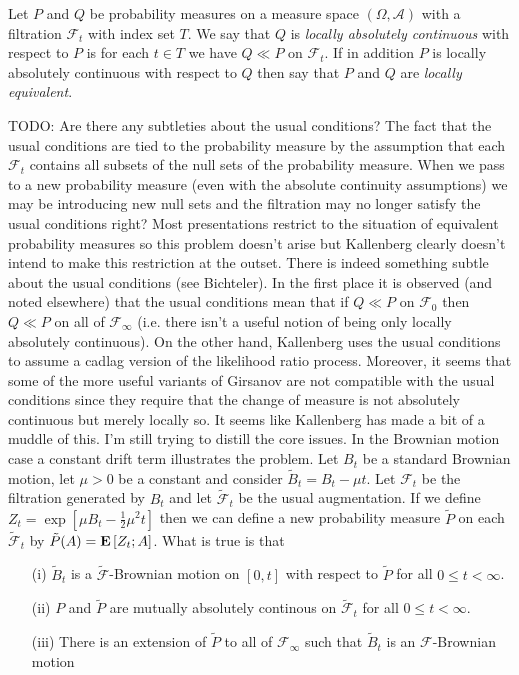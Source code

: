\begin{defn}Let $P$ and $Q$ be probability measures on a measure space $(\Omega, \mathcal{A})$ with a filtration $\mathcal{F}_t$ with index set $T$.  We say that $Q$ is \emph{locally absolutely continuous} with respect to $P$ is for each $t \in T$ we have $Q \ll P$ on $\mathcal{F}_t$.  If in addition $P$ is locally absolutely continuous with respect to $Q$ then say that $P$ and $Q$ are \emph{locally equivalent}.
\end{defn}

TODO:  Are there any subtleties about the usual conditions?  The fact that the usual conditions are tied to the probability measure by the assumption that each $\mathcal{F}_t$ contains all subsets of the null sets of the probability measure.  When we pass to a new probability measure (even with the absolute continuity assumptions) we may be introducing new null sets and the filtration may no longer satisfy the usual conditions right?  Most presentations restrict to the situation of equivalent probability measures so this problem doesn't arise but Kallenberg clearly doesn't intend to make this restriction at the outset.  There is indeed something subtle about the usual conditions (see Bichteler).  In the first place it is observed (and noted elsewhere) that the usual conditions mean that if $Q \ll P$ on $\mathcal{F}_0$ then $Q \ll P$ on all of $\mathcal{F}_\infty$ (i.e. there isn't a useful notion of being only locally absolutely continuous).  On the other hand, Kallenberg uses the usual conditions to assume a cadlag version of the likelihood ratio process.  Moreover, it seems that some of the more useful variants of Girsanov are not compatible with the usual conditions since they require that the change of measure is not absolutely continuous but merely locally so.  It seems like Kallenberg has made a bit of a muddle of this.  I'm still trying to distill the core issues.  In the Brownian motion case a constant drift term illustrates the problem.  Let $B_t$ be a standard Brownian motion, let $\mu > 0$ be a constant and consider $\tilde{B}_t = B_t - \mu t$.  Let $\mathcal{F}_t$ be the filtration generated by $B_t$ and let $\tilde{\mathcal{F}}_t$ be the usual augmentation.  If we define $Z_t = \exp\left [ \mu B_t - \frac{1}{2} \mu^2 t\right]$ then we can define a new probability measure $\tilde{P}$ on each $\tilde{\mathcal{F}}_t$ by $\tilde{P}(A) = \textbf{E}\left[Z_t ; A\right]$.  What is true is that
\begin{itemize}
\item[(i)]$\tilde{B}_t$ is a $\tilde{\mathcal{F}}$-Brownian motion on $[0,t]$ with respect to $\tilde{P}$ for all $0 \leq t < \infty$.
\item[(ii)]$P$ and $\tilde{P}$ are mutually absolutely continous on $\tilde{\mathcal{F}}_t$ for all $0 \leq t < \infty$.
\item[(iii)]There is an extension of $\tilde{P}$ to all of $\mathcal{F}_\infty$ such that $\tilde{B}_t$ is an $\mathcal{F}$-Brownian motion
\end{itemize}
